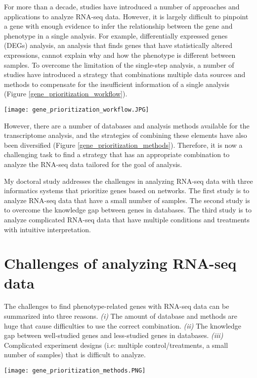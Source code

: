 \documentclass[oneside,phd]{snuthesis}
\begin{document}
For more than a decade, studies have introduced a number of approaches and applications to analyze RNA-seq data.
However, it is largely difficult to pinpoint a gene with enough evidence to infer the relationship between the gene and phenotype in a single analysis.
For example, differentially expressed genes (DEGs) analysis, an analysis that finds genes that have statistically altered expressions, cannot explain why and how the phenotype is different between samples.
To overcome the limitation of the single-step analysis, a number of studies have introduced a strategy that combinations multiple data sources and methods to compensate for the insufficient information of a single analysis (Figure \ref{gene_prioritization_workflow}).
\begin{figure*}
\begin{center}
\texttt{[image: gene\_prioritization\_workflow.JPG]}
\end{center}
\caption{Work flow for prioritizing genes (Moreau and Tranchevent, 2012)}
\label{gene_prioritization_workflow}
\end{figure*}

However, there are a number of databases and analysis methods available for the transcriptome analysis, and the strategies of combining these elements have also been diversified (Figure \ref{gene_prioritization_methods}). 
Therefore, it is now a challenging task to find a strategy that has an appropriate combination to analyze the RNA-seq data tailored for the goal of analysis.

My doctoral study addresses the challenges in analyzing RNA-seq data with three informatics systems that prioritize genes based on networks. 
The first study is to analyze RNA-seq data that have a small number of samples. 
The second study is to overcome the knowledge gap between genes in databases. The third study is to analyze complicated RNA-seq data that have multiple conditions and treatments with intuitive interpretation.

\section{Challenges of analyzing RNA-seq data}

The challenges to find phenotype-related genes with RNA-seq data can be summarized into three reasons. 
\textit{(i)} 
The amount of database and methods are huge that cause difficulties to use the correct combination.
\textit{(ii)} 
The knowledge gap between well-studied genes and less-studied genes in databases.
\textit{(iii)} Complicated experiment designs (i.e: multiple control/treatments, a small number of samples) that is difficult to analyze.
\begin{figure*}
\begin{center}
\texttt{[image: gene\_prioritization\_methods.PNG]}
\end{center}
\caption{Various strategies to prioritize genes (Moreau and Tranchevent, 2012)}
\label{gene_prioritization_methods}
\end{figure*}
\end{document}

